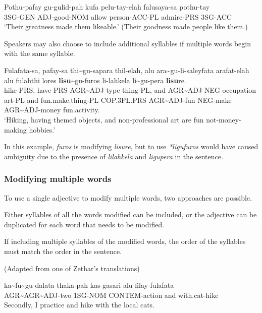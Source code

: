 \begin{exe}
    \ex{} \gll{}Pothu-pafay gu-gulid-pah kufa pelu-tay-elah falusaya-sa pothu-tay\\
    3SG-GEN ADJ-good-NOM allow person-ACC-PL admire-PRS 3SG-ACC\\
    \glt{}`Their greatness made them likeable.' (Their goodness made people like them.)
\end{exe}

Speakers may also choose to include additional syllables if multiple words begin with the same syllable.
\begin{exe}
    \ex{} \gll{}Fulafata-sa, pafay-sa thi\~{}gu-sapara thil-elah, alu ara\~{}gu-li-saleyfata arafat-elah alu fulahthi lores \textbf{lisu}\~{}gu-furos li-lahkela li\~{}gu-pera \textbf{lisu}re.\\
    hike-PRS, have-PRS AGR\~{}ADJ-type thing-PL, and AGR\~{}ADJ-NEG-occupation art-PL and fun.make.thing-PL COP.3PL.PRS AGR\~{}ADJ-fun NEG-make AGR\~{}ADJ-money fun.activity.\\
    \glt{}`Hiking, having themed objects, and non-professional art are fun not-money-making hobbies.'
\end{exe}    

In this example, \textit{furos} is modifying \textit{lisure}, but to use \textit{*ligufuros} would have caused ambiguity due to the presence of \textit{lilahkela} and \textit{ligupera} in the sentence.

\subsubsection{Modifying multiple words}
To use a single adjective to modify multiple words, two approaches are possible.

Either syllables of all the words modified can be included, or the adjective can be duplicated for each word that needs to be modified.

If including multiple syllables of the modified words, the order of the syllables must match the order in the sentence.

(Adapted from one of Zethar's translations)
\begin{exe}
\ex{} \gll{}ka\~{}fu\~{}gu-dalata       thaka-pah kas-gasari     alu filay-fulafata\\
            AGR\~{}AGR\~{}ADJ-two 1SG-NOM   CONTEM-action  and with.cat-hike\\
      \glt{}Secondly, I practice and hike with the local cats.
\end{exe}

